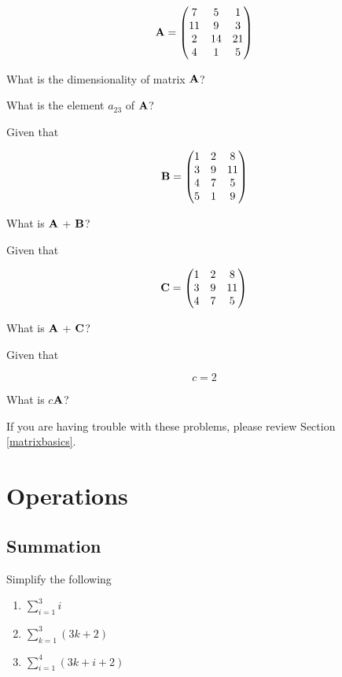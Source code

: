 \documentclass[]{book}
\theoremstyle{definition}
\theoremstyle{definition}
\theoremstyle{definition}
\theoremstyle{remark}
\begin{document}
\[{\bf A}=\begin{pmatrix}
            7 & 5 & 1 \\
            11 & 9 & 3 \\ 
            2 & 14 & 21 \\ 
            4 & 1 & 5
        \end{pmatrix}\]

What is the dimensionality of matrix \({\bf A}\)?

What is the element \(a_{23}\) of \({\bf A}\)?

Given that

\[{\bf B}=\begin{pmatrix}
            1 & 2 & 8 \\
            3 & 9 & 11 \\ 
            4 & 7 & 5 \\ 
            5 & 1 & 9
        \end{pmatrix}\]

What is \({\bf A}\) + \({\bf B}\)?

Given that

\[{\bf C}=\begin{pmatrix}
            1 & 2 & 8 \\
            3 & 9 & 11 \\ 
            4 & 7 & 5 \\ 
        \end{pmatrix}\]

What is \({\bf A}\) + \({\bf C}\)?

Given that

\[c = 2\]

What is \(c\)\({\bf A}\)?

If you are having trouble with these problems, please review Section
\ref{matrixbasics}.

\section*{Operations}\label{operations}

\subsection*{Summation}\label{summation}

Simplify the following

\begin{enumerate}
\def\labelenumi{\arabic{enumi}.}
\item
  \(\sum\limits_{i = 1}^3 i\)
\item
  \(\sum\limits_{k = 1}^3(3k + 2)\)
\item
  \(\sum\limits_{i= 1}^4 (3k + i + 2)\)
\end{enumerate}
\end{document}
